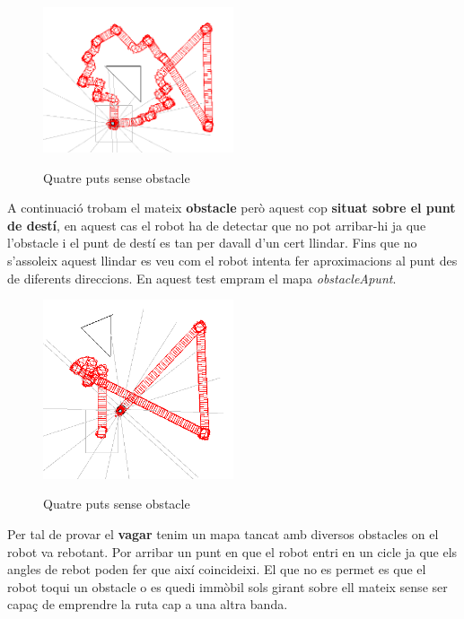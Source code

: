 \begin{figure}[H]
\begin{center}\label{4puntsObs}
 \includegraphics[width=0.5\textwidth]{diagrames/figures/4puntsObs.png}
\end{center}
  \caption{Quatre puts sense obstacle}
\end{figure}


A continuació trobam el mateix \textbf{obstacle} però aquest cop \textbf{situat sobre el punt de destí}, en aquest cas
el robot ha de detectar que no pot arribar-hi ja que l'obstacle i el punt de destí es tan per davall d'un cert
llindar. Fins que no s'assoleix aquest llindar es veu com el robot intenta fer aproximacions al punt des de
diferents direccions. En aquest test empram el mapa \emph{obstacleApunt}.

\begin{figure}[H]
\begin{center}\label{obsapunt}
 \includegraphics[width=0.5\textwidth]{diagrames/figures/obsapunt.png}
\end{center}
  \caption{Quatre puts sense obstacle}
\end{figure}


Per tal de provar el \textbf{vagar} tenim un mapa tancat amb diversos obstacles on el robot va rebotant.
Por arribar un punt en que el robot entri en un cicle ja que els angles de rebot poden fer que així
coincideixi. El que no es permet es que el robot toqui un obstacle o es quedi immòbil sols girant sobre
ell mateix sense ser capaç de emprendre la ruta cap a una altra banda.

